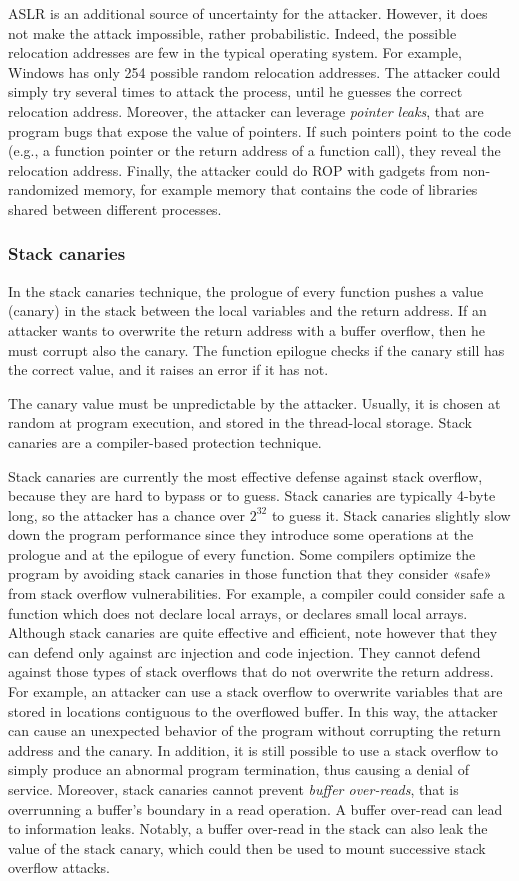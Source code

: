 \documentclass[a4paper,12pt]{article}
\begin{document}
ASLR is an additional source of uncertainty for the attacker. However, it does not make the attack impossible, rather probabilistic. Indeed, the possible relocation addresses are few in the typical operating system. For example, Windows has only 254 possible random relocation addresses. The attacker could simply try several times to attack the process, until he guesses the correct relocation address. Moreover, the attacker can leverage \textit{pointer leaks}, that are program bugs that expose the value of pointers. If such pointers point to the code (e.g., a function pointer or the return address of a function call), they reveal the relocation address. Finally, the attacker could do ROP with gadgets from non-randomized memory, for example memory that contains the code of libraries shared between different processes.

\subsubsection{Stack canaries}
In the stack canaries technique, the prologue of every function pushes a value (canary) in the stack between the local variables and the return address. If an attacker wants to overwrite the return address with a buffer overflow, then he must corrupt also the canary. The function epilogue checks if the canary still has the correct value, and it raises an error if it has not.

The canary value must be unpredictable by the attacker. Usually, it is chosen at random at program execution, and stored in the thread-local storage. Stack canaries are a compiler-based protection technique.

Stack canaries are currently the most effective defense against stack overflow, because they are hard to bypass or to guess. Stack canaries are typically 4-byte long, so the attacker has a chance over $2^{32}$ to guess it. Stack canaries slightly slow down the program performance since they introduce some operations at the prologue and at the epilogue of every function. Some compilers optimize the program by avoiding stack canaries in those function that they consider «safe» from stack overflow vulnerabilities. For example, a compiler could consider safe a function which does not declare local arrays, or declares small local arrays.
Although stack canaries are quite effective and efficient, note however that they can defend only against arc injection and code injection. They cannot defend against those types of stack overflows that do not overwrite the return address. For example, an attacker can use a stack overflow to overwrite variables that are stored in locations contiguous to the overflowed buffer. In this way, the attacker can cause an unexpected behavior of the program without corrupting the return address and the canary. In addition, it is still possible to use a stack overflow to simply produce an abnormal program termination, thus causing a denial of service. Moreover, stack canaries cannot prevent \textit{buffer over-reads}, that is overrunning a buffer’s boundary in a read operation. A buffer over-read can lead to information leaks. Notably, a buffer over-read in the stack can also leak the value of the stack canary, which could then be used to mount successive stack overflow attacks.
\end{document}
